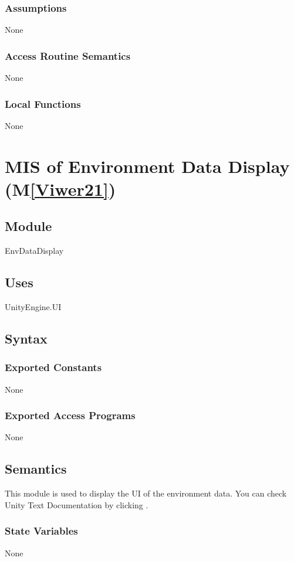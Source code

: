 \documentclass[12pt, titlepage]{article}
\newcommand{\mref}[1]{M\ref{#1}}
\begin{document}
\subsubsection{Assumptions}
None

\subsubsection{Access Routine Semantics}
None



\subsubsection{Local Functions}
None

\newpage


\section{MIS of Environment Data Display (\mref{Viwer21})} 

\subsection{Module}
EnvDataDisplay

\subsection{Uses}
UnityEngine.UI 

\subsection{Syntax}

\subsubsection{Exported Constants}
None
\subsubsection{Exported Access Programs}
None

\subsection{Semantics}
This module is used to display the UI of the environment data. 
You can check Unity Text Documentation by clicking \tref.
\subsubsection{State Variables}
None
\end{document}

